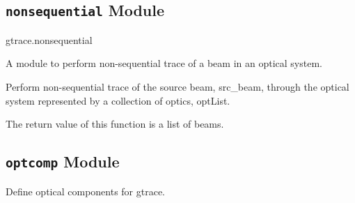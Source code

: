 \documentclass[letterpaper,10pt,english]{sphinxmanual}
\begin{document}

\begin{fulllineitems}
\label{api/gtrace:gtrace.hello.saysomething}
\end{fulllineitems}



\subsection{\texttt{nonsequential} Module}
\label{api/gtrace:nonsequential-module}\label{api/gtrace:module-gtrace.nonsequential}
gtrace.nonsequential

A module to perform non-sequential trace of a beam
in an optical system.

\begin{fulllineitems}
\label{api/gtrace:gtrace.nonsequential.non_seq_trace}
Perform non-sequential trace of the source beam, src\_beam,
through the optical system represented by a collection of optics,
optList.

The return value of this function is a list of beams.

\end{fulllineitems}



\subsection{\texttt{optcomp} Module}
\label{api/gtrace:optcomp-module}\label{api/gtrace:module-gtrace.optcomp}
Define optical components for gtrace.
\end{document}
